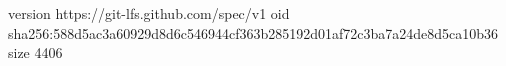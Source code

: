 version https://git-lfs.github.com/spec/v1
oid sha256:588d5ac3a60929d8d6c546944cf363b285192d01af72c3ba7a24de8d5ca10b36
size 4406
